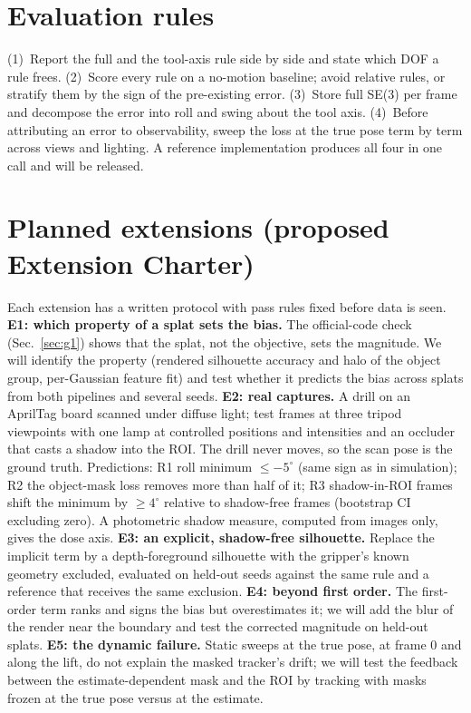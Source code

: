 \documentclass[conference]{IEEEtran}
\begin{document}
\section{Evaluation rules}\label{sec:recs}
(1)~Report the full and the tool-axis rule side by side and state which DOF a rule frees. (2)~Score every rule on a
no-motion baseline; avoid relative rules, or stratify them by the sign of the pre-existing error. (3)~Store full
SE(3) per frame and decompose the error into roll and swing about the tool axis. (4)~Before attributing an error to
observability, sweep the loss at the true pose term by term across views and lighting. A reference implementation
produces all four in one call and will be released.

\section{Planned extensions (proposed Extension Charter)}
Each extension has a written protocol with pass rules fixed before data is seen.
\textbf{E1: which property of a splat sets the bias.} The official-code check (Sec.~\ref{sec:g1}) shows that the
splat, not the objective, sets the magnitude. We will identify the property (rendered silhouette accuracy and halo of
the object group, per-Gaussian feature fit) and test whether it predicts the bias across splats from both pipelines
and several seeds.
\textbf{E2: real captures.} A drill on an AprilTag board scanned under diffuse light; test frames at three tripod
viewpoints with one lamp at controlled positions and intensities and an occluder that casts a shadow into the ROI.
The drill never moves, so the scan pose is the ground truth. Predictions: R1 roll minimum $\le-5^\circ$ (same sign as in
simulation); R2 the object-mask loss removes more than half of it; R3 shadow-in-ROI frames shift the minimum by
$\ge4^\circ$ relative to shadow-free frames (bootstrap CI excluding zero). A photometric shadow measure, computed from
images only, gives the dose axis.
\textbf{E3: an explicit, shadow-free silhouette.} Replace the implicit term by a depth-foreground silhouette with the
gripper's known geometry excluded, evaluated on held-out seeds against the same rule and a reference that receives
the same exclusion.
\textbf{E4: beyond first order.} The first-order term ranks and signs the bias but overestimates it; we will add the
blur of the render near the boundary and test the corrected magnitude on held-out splats.
\textbf{E5: the dynamic failure.} Static sweeps at the true pose, at frame 0 and along the lift, do not explain
the masked tracker's drift; we will test the feedback between the estimate-dependent mask and the ROI by tracking
with masks frozen at the true pose versus at the estimate.
\end{document}
